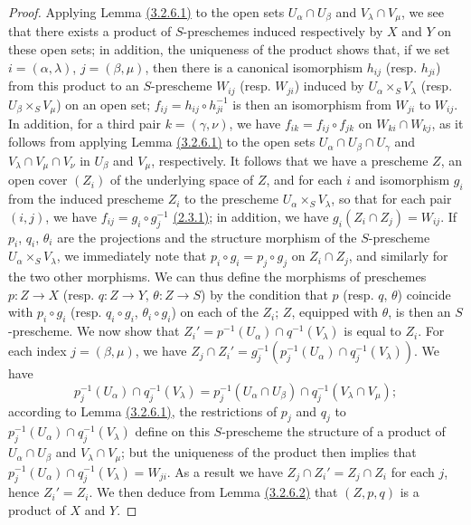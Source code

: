 \begin{proof}
Applying Lemma \hyperref[lem-1.3.2.6.1]{(3.2.6.1)} to the open sets $U_\alpha\cap U_\beta$ and
$V_\lambda\cap V_\mu$, we see that there exists a product of $S$-preschemes induced
respectively by $X$ and $Y$ on these open sets; in addition, the uniqueness of the product
shows that, if we set $i=(\alpha,\lambda)$, $j=(\beta,\mu)$, then there is a canonical
isomorphism $h_{ij}$ (resp. $h_{ji}$) from this product to an $S$-prescheme $W_{ij}$
(resp. $W_{ji}$) induced by $U_\alpha\times_S V_\lambda$ (resp. $U_\beta\times_S V_\mu$) on
an open set; $f_{ij}=h_{ij}\circ h_{ji}^{-1}$ is then an isomorphism from $W_{ji}$ to
$W_{ij}$. In addition, for a third pair $k=(\gamma,\nu)$, we have
$f_{ik}=f_{ij}\circ f_{jk}$ on
$W_{ki}\cap W_{kj}$, as it follows from applying Lemma \hyperref[lem-1.3.2.6.1]{(3.2.6.1)} to
the open sets $U_\alpha\cap U_\beta\cap U_\gamma$ and $V_\lambda\cap V_\mu\cap V_\nu$ in
$U_\beta$ and $V_\mu$, respectively. It follows that we have a prescheme $Z$, an open cover
$(Z_i)$ of the underlying space of $Z$, and for each $i$ and isomorphism $g_i$ from the
induced prescheme
$Z_i$ to the prescheme $U_\alpha\times_S V_\lambda$, so that for each pair $(i,j)$, we have
$f_{ij}=g_i\circ g_j^{-1}$ \hyperref[env-1.2.3.1]{(2.3.1)}; in addition, we have $g_i(Z_i\cap Z_j)=W_{ij}$.
If $p_i$, $q_i$, $\theta_i$ are the projections and the structure morphism of the
$S$-prescheme $U_\alpha\times_S V_\lambda$, we immediately note that
$p_i\circ g_i=p_j\circ g_j$ on $Z_i\cap Z_j$, and similarly for the two other morphisms. We
can thus define the morphisms of preschemes $p:Z\to X$ (resp. $q:Z\to Y$, $\theta:Z\to S$) by
the condition that $p$ (resp. $q$, $\theta$) coincide with $p_i\circ g_i$
(resp. $q_i\circ g_i$, $\theta_i\circ g_i$) on each of the $Z_i$; $Z$, equipped with
$\theta$, is then an $S$-prescheme. We now show that
$Z_i'=p^{-1}(U_\alpha)\cap q^{-1}(V_\lambda)$ is equal to $Z_i$. For each index
$j=(\beta,\mu)$, we have $Z_j\cap Z_i'=g_j^{-1}(p_j^{-1}(U_\alpha)\cap q_j^{-1}(V_\lambda))$.
We have
\[
  p_j^{-1}(U_\alpha)\cap q_j^{-1}(V_\lambda)
  =p_j^{-1}(U_\alpha\cap U_\beta)\cap q_j^{-1}(V_\lambda\cap V_\mu);
\]
according to Lemma \hyperref[lem-1.3.2.6.1]{(3.2.6.1)}, the restrictions of $p_j$ and $q_j$ to
$p_j^{-1}(U_\alpha)\cap q_j^{-1}(V_\lambda)$ define on this $S$-prescheme the structure of a
product of $U_\alpha\cap U_\beta$ and $V_\lambda\cap V_\mu$; but the uniqueness of the
product then implies that $p_j^{-1}(U_\alpha)\cap q_j^{-1}(V_\lambda)=W_{ji}$. As a result we
have $Z_j\cap Z_i'=Z_j\cap Z_i$ for each $j$, hence $Z_i'=Z_i$. We then deduce from
Lemma \hyperref[lem-1.3.2.6.2]{(3.2.6.2)} that $(Z,p,q)$ is a product of $X$ and $Y$.


\end{proof}
